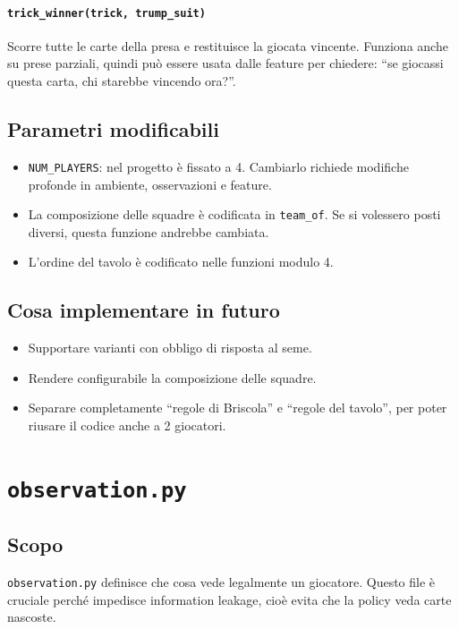 \documentclass[11pt,a4paper]{article}
\begin{document}
\paragraph{\texttt{trick\_winner(trick, trump\_suit)}}

Scorre tutte le carte della presa e restituisce la giocata vincente. Funziona
anche su prese parziali, quindi può essere usata dalle feature per chiedere:
``se giocassi questa carta, chi starebbe vincendo ora?''.

\subsection{Parametri modificabili}

\begin{itemize}
  \item \texttt{NUM\_PLAYERS}: nel progetto è fissato a 4. Cambiarlo richiede
  modifiche profonde in ambiente, osservazioni e feature.
  \item La composizione delle squadre è codificata in \texttt{team\_of}. Se si
  volessero posti diversi, questa funzione andrebbe cambiata.
  \item L'ordine del tavolo è codificato nelle funzioni modulo 4.
\end{itemize}

\subsection{Cosa implementare in futuro}

\begin{itemize}
  \item Supportare varianti con obbligo di risposta al seme.
  \item Rendere configurabile la composizione delle squadre.
  \item Separare completamente ``regole di Briscola'' e ``regole del tavolo'',
  per poter riusare il codice anche a 2 giocatori.
\end{itemize}

\section{\texttt{observation.py}}

\subsection{Scopo}

\texttt{observation.py} definisce che cosa vede legalmente un giocatore. Questo
file è cruciale perché impedisce information leakage, cioè evita che la policy
veda carte nascoste.
\end{document}
